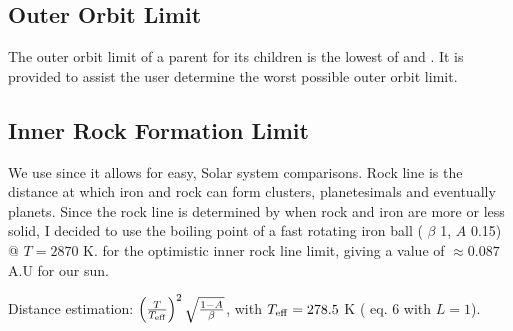 \documentclass[letterpaper,10pt,english]{sphinxmanual}
\begin{document}
\subsection{Outer Orbit Limit}
\label{\detokenize{quantities/children_orbit_limits/outer_orbit_limit:outer-orbit-limit}}\label{\detokenize{quantities/children_orbit_limits/outer_orbit_limit::doc}}\label{\detokenize{quantities/children_orbit_limits/outer_orbit_limit:id1}}
\sphinxAtStartPar
The outer orbit limit of a parent for its children is the lowest of
{\hyperref[\detokenize{quantities/children_orbit_limits/hill_sphere:id1}]{}} and {\hyperref[\detokenize{quantities/children_orbit_limits/s_type_critical_orbit:s-type-critical-orbit}]{}}.
It is provided to assist the user determine the worst possible outer orbit limit.


\subsection{Inner Rock Formation Limit}
\label{\detokenize{quantities/children_orbit_limits/inner_rock_formation_limit:inner-rock-formation-limit}}\label{\detokenize{quantities/children_orbit_limits/inner_rock_formation_limit::doc}}\label{\detokenize{quantities/children_orbit_limits/inner_rock_formation_limit:id1}}
\sphinxAtStartPar
We use {\hyperref[\detokenize{quantities/insolation_models/selsis/selsis:selsis-insolation-model}]{}} since it allows for easy, Solar system comparisons.
Rock line is the distance at which iron and rock can form clusters, planetesimals and eventually planets.
Since the rock line is determined by when rock and iron are more or less solid, I decided to use
the boiling point of a fast rotating iron ball
({\hyperref[\detokenize{quantities/surface/emission/heat_distribution:id1}]{}} \(\beta\) 1, {\hyperref[\detokenize{quantities/surface/emission/albedo:id1}]{}} \(A\) 0.15)
@ \(T = 2870\) K.
for the optimistic inner rock line limit, giving a value of \(\approx 0.087\) A.U for our sun.

\sphinxAtStartPar
Distance estimation: \(\left(\frac{T}{T_{\rm eff}}\right) ^ 2 \sqrt{\frac{1-A}{\beta}}\),
with \(T_{\rm eff} = 278.5\) K ( eq. 6 with \(L = 1\)).
\end{document}
